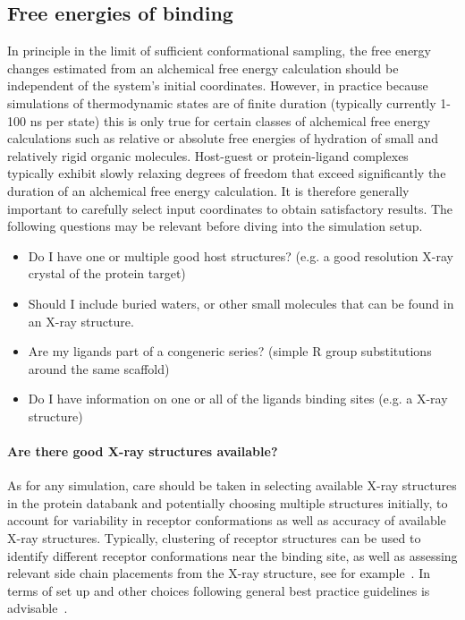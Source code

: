 \documentclass[9pt,bestpractices]{livecoms}
\begin{document}
\subsection*{Free energies of binding}
In principle in the limit of sufficient conformational sampling, the free energy changes estimated from an alchemical free energy calculation should be independent of the system's initial coordinates. However, in practice because simulations of thermodynamic states are of finite duration (typically currently 1-100 ns per state) this is only true for certain classes of alchemical free energy calculations such as relative or absolute free energies of hydration of small and relatively rigid organic molecules. Host-guest or protein-ligand complexes typically exhibit slowly relaxing degrees of freedom that exceed significantly the duration of an alchemical free energy calculation. It is therefore generally important to carefully select input coordinates to obtain satisfactory results. 
The following questions may be relevant before diving into the simulation setup. 
\begin{itemize}
    \item Do I have one or multiple good host structures? (e.g. a good resolution X-ray crystal of the protein target)
    \item Should I include buried waters, or other small molecules that can be found in an X-ray structure.
    \item Are my ligands part of a congeneric series? (simple R group substitutions around the same scaffold)
    \item Do I have information on one or all of the ligands binding sites (e.g. a X-ray structure)
\end{itemize}

\paragraph{Are there good X-ray structures available?}
As for any simulation, care should be taken in selecting available X-ray structures in the protein databank and potentially choosing multiple structures initially, to account for variability in receptor conformations as well as accuracy of available X-ray structures. Typically, clustering of receptor structures can be used to identify different receptor conformations near the binding site, as well as assessing relevant side chain placements from the X-ray structure, see for example~\cite{mey2016blinded}. In terms of set up and other choices following general best practice guidelines is advisable~\cite{braun2018best}.
\end{document}
